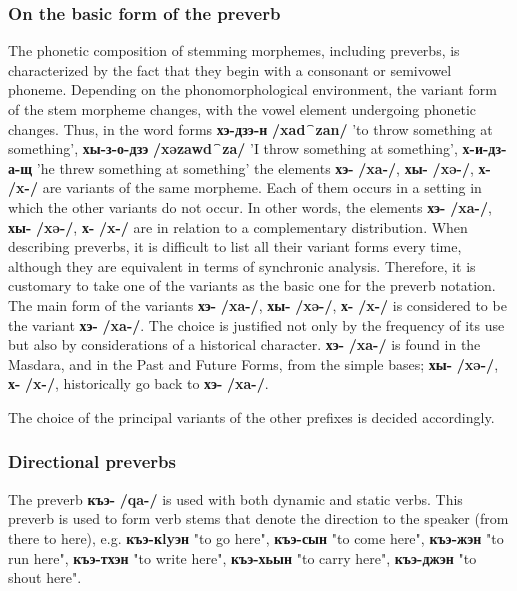 \documentclass[a4paper,12pt]{book}
\newcommand{\1}[1]{\textbf{\emph{#1}}} %
\newcommand{\2}[1]{\textbf{[#1]}} %
\newcommand{\3}[1]{\fontsize{11pt}{0cm}\textbf{\emph{#1}}} %
\newcommand{\4}[1]{\fontsize{10pt}{0cm}\emph{#1}}	%
\newcommand{\5}[1]{\textbf{/#1/}} %
\newcommand{\6}[1]{\textbf{[#1]}} %
\newcommand{\7}[1]{\fontsize{12pt}{0cm}\emph{#1}} %
\newcommand{\8}[1]{\fontsize{12pt}{0cm}`#1'} %
\newcommand{\9}[1]{\fontsize{12pt}{0cm}(lit. `#1')} %
\newcommand{\glossphonemics}[1]{\textbf{/#1/}} %
\begin{document}
\subsubsection{On the basic form of the preverb}
The phonetic composition of stemming morphemes, including preverbs, is characterized by the fact that they begin with a consonant or semivowel phoneme. Depending on the phonomorphological environment, the variant form of the stem morpheme changes, with the vowel element undergoing phonetic changes. Thus, in the word forms \textbf{хэ-дзэ-н} \glossphonemics{xad⁀zan} 'to throw something at something', \textbf{хы-з-о-дзэ} \glossphonemics{xəzawd⁀za} 'I throw something at something', \textbf{х-и-дз-а-щ} 'he threw something at something' the elements \textbf{хэ-} \glossphonemics{xa-}, \textbf{хы-} \glossphonemics{xə-}, \textbf{х-} \glossphonemics{x-} are variants of the same morpheme. Each of them occurs in a setting in which the other variants do not occur. In other words, the elements \textbf{хэ-} \glossphonemics{xa-}, \textbf{хы-} \glossphonemics{xə-}, \textbf{х-} \glossphonemics{x-} are in relation to a complementary distribution. When describing preverbs, it is difficult to list all their variant forms every time, although they are equivalent in terms of synchronic analysis. Therefore, it is customary to take one of the variants as the basic one for the preverb notation. The main form of the variants \textbf{хэ-} \glossphonemics{xa-}, \textbf{хы-} \glossphonemics{xə-}, \textbf{х-} \glossphonemics{x-} is considered to be the variant \textbf{хэ-} \glossphonemics{xa-}. The choice is justified not only by the frequency of its use but also by considerations of a historical character. \textbf{хэ-} \glossphonemics{xa-} is found in the Masdara, and in the Past and Future Forms, from the simple bases; \textbf{хы-} \glossphonemics{xə-}, \textbf{х-} \glossphonemics{x-}, historically go back to \textbf{хэ-} \glossphonemics{xa-}.

The choice of the principal variants of the other prefixes is decided accordingly.
\subsubsection{Directional preverbs}
The preverb \textbf{къэ-} \glossphonemics{qa-} is used with both dynamic and static verbs. This preverb is used to form verb stems that denote the direction to the speaker (from there to here), e.g. \textbf{къэ-кlyэн} "to go here", \textbf{къэ-сын} "to come here", \textbf{къэ-жэн} "to run here", \textbf{къэ-тхэн} "to write here", \textbf{къэ-хьын} "to carry here", \textbf{къэ-джэн} "to shout here".
\end{document}
